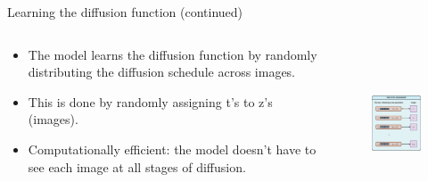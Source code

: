 \documentclass[8pt]{beamer}
\begin{document}
\begin{frame}{Learning the diffusion function (continued)}
    \begin{columns}
        \begin{column}{0.5\textwidth}
            \begin{itemize}
                \item The model learns the diffusion function by randomly distributing the diffusion schedule across images.
                \item This is done by randomly assigning t's to z's (images).
                \item Computationally efficient: the model doesn't have to see each image at all stages of diffusion.
            \end{itemize}
        \end{column}
        \begin{column}{0.5\textwidth}
           \begin{figure}
               \vfill
               \hfill
               \includegraphics[width=130pt, height=130pt]{images/time_schedule_assignment.png}
               \label{fig:NN_training}
           \end{figure}
        \end{column}
   \end{columns}
\end{frame}
\end{document}
